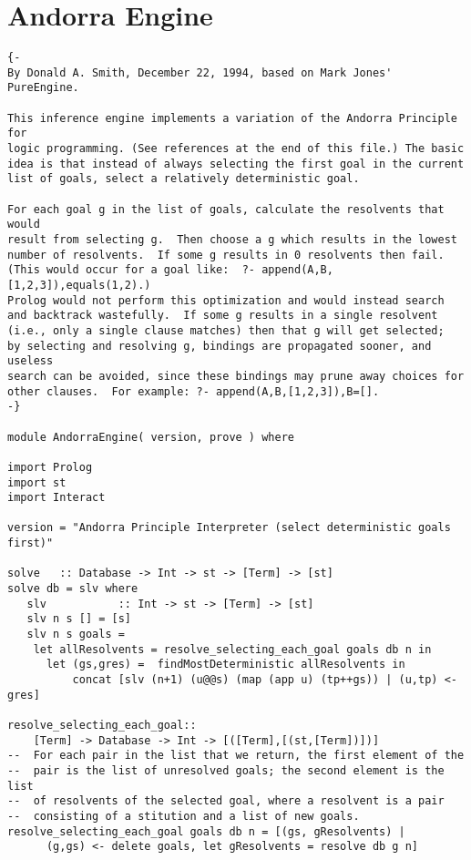 \documentclass[thesis-solanki.tex]{files}
\begin{document}
\section{Andorra Engine}
\begin{verbatim}
{-
By Donald A. Smith, December 22, 1994, based on Mark Jones' PureEngine.

This inference engine implements a variation of the Andorra Principle for
logic programming. (See references at the end of this file.) The basic
idea is that instead of always selecting the first goal in the current
list of goals, select a relatively deterministic goal.

For each goal g in the list of goals, calculate the resolvents that would
result from selecting g.  Then choose a g which results in the lowest
number of resolvents.  If some g results in 0 resolvents then fail.
(This would occur for a goal like:  ?- append(A,B,[1,2,3]),equals(1,2).)
Prolog would not perform this optimization and would instead search
and backtrack wastefully.  If some g results in a single resolvent
(i.e., only a single clause matches) then that g will get selected;
by selecting and resolving g, bindings are propagated sooner, and useless
search can be avoided, since these bindings may prune away choices for
other clauses.  For example: ?- append(A,B,[1,2,3]),B=[].
-}

module AndorraEngine( version, prove ) where

import Prolog
import st
import Interact

version = "Andorra Principle Interpreter (select deterministic goals first)"

solve   :: Database -> Int -> st -> [Term] -> [st]
solve db = slv where
   slv           :: Int -> st -> [Term] -> [st]
   slv n s [] = [s]
   slv n s goals =
    let allResolvents = resolve_selecting_each_goal goals db n in
      let (gs,gres) =  findMostDeterministic allResolvents in
          concat [slv (n+1) (u@@s) (map (app u) (tp++gs)) | (u,tp) <- gres]

resolve_selecting_each_goal::
    [Term] -> Database -> Int -> [([Term],[(st,[Term])])]
--  For each pair in the list that we return, the first element of the
--  pair is the list of unresolved goals; the second element is the list
--  of resolvents of the selected goal, where a resolvent is a pair
--  consisting of a stitution and a list of new goals.
resolve_selecting_each_goal goals db n = [(gs, gResolvents) |
      (g,gs) <- delete goals, let gResolvents = resolve db g n]


\end{verbatim}
\end{document}
